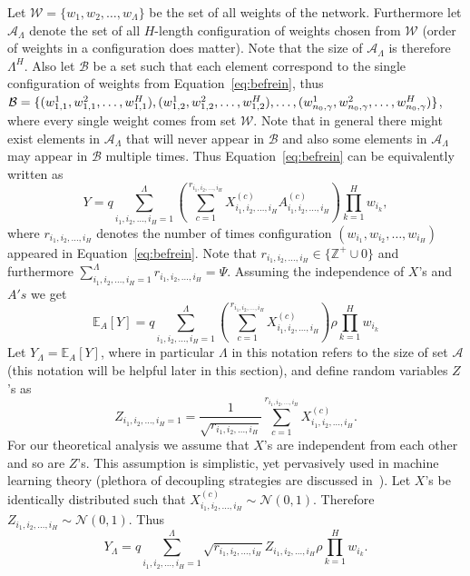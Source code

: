 \documentclass[twoside]{article}
\begin{document}
Let $\mathcal{W} = \{w_1,w_2,\dots,w_{\Lambda}\}$ be the set of all weights of the network. Furthermore let $\mathcal{A}_{\Lambda}$ denote the set of all $H$-length configuration of weights chosen from $\mathcal{W}$ (order of weights in a configuration does matter). Note that the size of $\mathcal{A}_{\Lambda}$ is therefore $\Lambda^H$. Also let $\mathcal{B}$ be a set such that each element correspond to the single configuration of weights from Equation~\ref{eq:befrein}, thus $\mathcal{B} = \{(w_{1,1}^1,w_{1,1}^2,\dots,w_{1,1}^H),(w_{1,2}^1,w_{1,2}^2,\dots,w_{1,2}^H),\dots,\\(w_{n_0,\gamma}^1,w_{n_0,\gamma}^2,\dots,w_{n_0,\gamma}^H)\}$, where every single weight comes from set $\mathcal{W}$. Note that in general there might exist elements in $\mathcal{A}_{\Lambda}$ that will never appear in $\mathcal{B}$ and also some elements in $\mathcal{A}_{\Lambda}$ may appear in $\mathcal{B}$ multiple times. Thus Equation~\ref{eq:befrein} can be equivalently written as 
\[Y \!=\! q\!\!\!\!\sum_{i_1,i_2,\dots,i_H=1}^{\Lambda}\!\!\!\left(\sum_{c=1}^{r_{i_1,i_2,\dots,i_H}}\!\!\!X_{i_1,i_2,\dots,i_H}^{(c)}A_{i_1,i_2,\dots,i_H}^{(c)}\!\!\right)\!\!\prod_{k = 1}^{H}w_{i_k},
\]
where $r_{i_1,i_2,\dots,i_H}$ denotes the number of times configuration $(w_{i_1},w_{i_2},\dots,w_{i_H})$ appeared in Equation~\ref{eq:befrein}. Note that $r_{i_1,i_2,\dots,i_H} \in \{\mathbb{Z}^{+}\cup{0}\}$ and furthermore $\sum_{i_1,i_2,\dots,i_H=1}^{\Lambda}r_{i_1,i_2,\dots,i_H} = \Psi$. Assuming the independence of $X$'s and $A's$ we get
\[\mathbb{E}_A[Y] = q\!\!\sum_{i_1,i_2,\dots,i_H=1}^{\Lambda}\left(\sum_{c=1}^{r_{i_1,i_2,\dots,i_H}}X_{i_1,i_2,\dots,i_H}^{(c)}\right)\rho\prod_{k = 1}^{H}w_{i_k}
\]
Let $Y_{\Lambda} = \mathbb{E}_A[Y]$, where in particular $\Lambda$ in this notation refers to the size of set $\mathcal{A}$ (this notation will be helpful later in this section), and define random variables $Z$'s as
\[Z_{i_1,i_2,\dots,i_H=1} = \frac{1}{\sqrt{r_{i_1,i_2,\dots,i_H}}}\sum_{c=1}^{r_{i_1,i_2,\dots,i_H}}X_{i_1,i_2,\dots,i_H}^{(c)}.
\]
For our theoretical analysis we assume that $X$'s are independent from each other and so are $Z$'s. This assumption is simplistic, yet pervasively used in machine learning theory (plethora of decoupling strategies are discussed in~\cite{opac-b1095246}). Let $X$'s be identically distributed such that $X_{i_1,i_2,\dots,i_H}^{(c)}\sim\mathcal{N}(0,1)$. Therefore $Z_{i_1,i_2,\dots,i_H}\sim\mathcal{N}(0,1)$. Thus 
\begin{equation}
Y_{\Lambda}= q\!\!\!\sum_{i_1,i_2,\dots,i_H=1}^{\Lambda}\sqrt{r_{i_1,i_2,\dots,i_H}}Z_{i_1,i_2,\dots,i_H}\rho\prod_{k = 1}^{H}w_{i_k}.
\label{eq:befapprox}
\end{equation}
\end{document}
